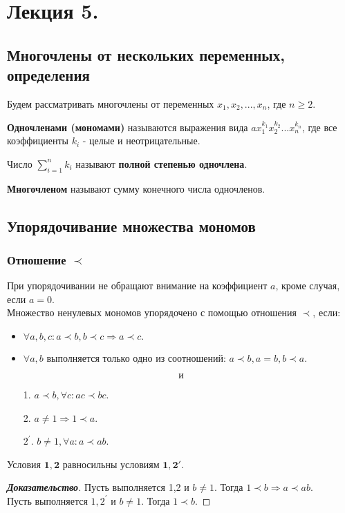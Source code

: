\documentclass[12pt]{article}
\begin{document}
\section{Лекция 5.}
\subsection{Многочлены от нескольких переменных, определения}
\indent Будем рассматривать многочлены от переменных $x_1, x_2, ..., x_n$, где $n \geq 2$.
\begin{defn}
\textbf{Одночленами (мономами)} называются выражения вида $ax_1^{k_1}x_2^{k_2}...x_n^{k_n}$, где все коэффициенты $k_i$ - целые и неотрицательные.
\end{defn}
\begin{defn}
Число $\sum\limits_{i=1}^n k_i$ называют \textbf{полной степенью одночлена}.
\end{defn}
\begin{defn}
\textbf{Многочленом} называют сумму конечного числа одночленов.
\end{defn}

\subsection{Упорядочивание множества мономов}
\subsubsection{Отношение $\prec$}
\indent \indent При упорядочивании не обращают внимание на коэффициент $a$, кроме случая, если $a = 0$. \\
\indent Множество ненулевых мономов упорядочено с помощью отношения $\prec$, если:
\begin{itemize}
\item $\forall a,b,c: a \prec b, b \prec c \Rightarrow a \prec c.$
\item $\forall a,b \text{ выполняется только одно из соотношений: }a \prec b, a = b, b \prec a.$
\end{itemize}
$$\text{и}$$
\begin{itemize}
\item[1.] $a \prec b, \forall c: ac \prec bc.$
\item[2.] $a \neq 1 \Rightarrow 1 \prec a.$
\item[$2^{'}\!.$] $b \neq 1, \forall a: a \prec ab.$
\end{itemize}
\indent Условия $\bm{1,2}$ равносильны условиям $\bm{1,2'}$.
\begin{proof}[\textbf{Доказательство}]
\indent Пусть выполняется 1,2 и $b \neq 1$. Тогда $1 \prec b \Rightarrow a \prec ab$. \\
\indent Пусть выполняется $1,\!2^{'}$ и $b \neq 1$. Тогда $1 \prec b$. 
\end{proof}
\end{document}
